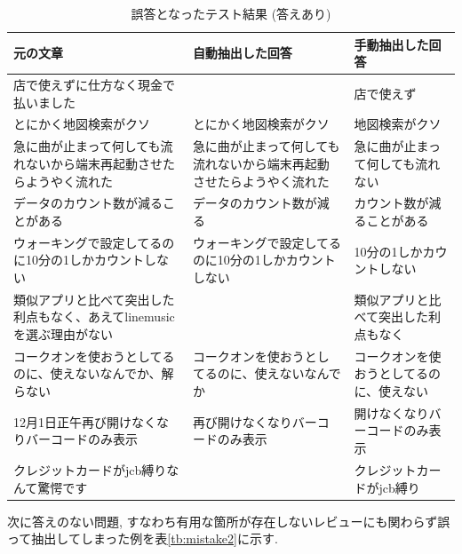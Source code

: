 \begin{table}[H]
  \caption{誤答となったテスト結果 (答えあり) }
  \small
  \label{tb:mistake}
  \begin{center}
  \begin{tabularx}{\linewidth}{X|X|X}
    \hline
    元の文章&自動抽出した回答&手動抽出した回答\\\hline\hline
    店で使えずに仕方なく現金で払いました&&店で使えず\\\hline
    とにかく地図検索がクソ&とにかく地図検索がクソ&地図検索がクソ\\\hline
    急に曲が止まって何しても流れないから端末再起動させたらようやく流れた&急に曲が止まって何しても流れないから端末再起動させたらようやく流れた&急に曲が止まって何しても流れない\\\hline
    データのカウント数が減ることがある&データのカウント数が減る&カウント数が減ることがある\\\hline
    ウォーキングで設定してるのに10分の1しかカウントしない&ウォーキングで設定してるのに10分の1しかカウントしない&10分の1しかカウントしない\\\hline
    類似アプリと比べて突出した利点もなく、あえてlinemusicを選ぶ理由がない&&類似アプリと比べて突出した利点もなく\\\hline
    コークオンを使おうとしてるのに、使えないなんでか、解らない&コークオンを使おうとしてるのに、使えないなんでか&コークオンを使おうとしてるのに、使えない\\\hline
    12月1日正午再び開けなくなりバーコードのみ表示&再び開けなくなりバーコードのみ表示&開けなくなりバーコードのみ表示\\\hline
    クレジットカードがjcb縛りなんて驚愕です&&クレジットカードがjcb縛り\\\hline
  \end{tabularx}\end{center}
\end{table}

次に答えのない問題, すなわち有用な箇所が存在しないレビューにも関わらず誤って抽出してしまった例を表\ref{tb:mistake2}に示す.

